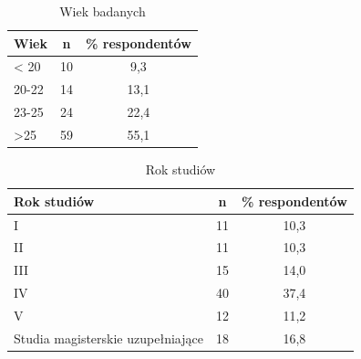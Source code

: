 
\begin{table}[H]
    \centering
    \caption{Wiek badanych}
    \label{tab:wiek}
    \begin{tabular}{|l|c|c|}
        \hline
        \textbf{Wiek} & \textbf{n} & \textbf{\% respondentów} \\
        \hline
        \hline
        < 20 & 10 & 9,3 \\
        \hline
        20-22 & 14 & 13,1 \\
        \hline
        23-25 & 24 & 22,4 \\
        \hline
        >25 & 59 & 55,1 \\
        \hline
    \end{tabular}
\end{table}



\begin{table}[H]
    \centering
    \caption{Rok studiów}
    \label{tab:rok-studiow}
    \begin{tabular}{|l|c|c|}
        \hline
        \textbf{Rok studiów} & \textbf{n} & \textbf{\% respondentów} \\
        \hline
        \hline
        I & 11 & 10,3 \\
        \hline
        II & 11 & 10,3 \\
        \hline
        III & 15 & 14,0 \\
        \hline
        IV & 40 & 37,4 \\
        \hline
        V & 12 & 11,2 \\
        \hline
        Studia magisterskie uzupełniające & 18 & 16,8 \\
        \hline
    \end{tabular}
\end{table}



